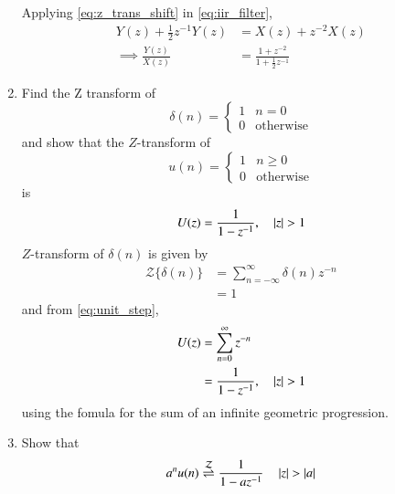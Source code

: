 \documentclass[journal,12pt,twocolumn]{IEEEtran}
\renewcommand\thesection{\arabic{section}}
\begin{document}
\begin{enumerate}[label=\thesection.\arabic*]

	
\solution  Applying \eqref{eq:z_trans_shift} in \eqref{eq:iir_filter},
\begin{align}
Y(z) + \frac{1}{2}z^{-1}Y(z) &= X(z)+z^{-2}X(z)
\\
\implies \frac{Y(z)}{X(z)} &= \frac{1 + z^{-2}}{1 + \frac{1}{2}z^{-1}}
\label{eq:freq_resp}
\end{align}
\item Find the Z transform of 
\begin{equation}
\delta(n)
=
\begin{cases}
1 & n = 0
\\
0 & \text{otherwise}
\end{cases}
\end{equation}
and show that the $Z$-transform of
\begin{equation}
\label{eq:unit_step}
u(n)
=
\begin{cases}
1 & n \ge 0
\\
0 & \text{otherwise}
\end{cases}
\end{equation}
is
\begin{equation}
U(z) = \frac{1}{1-z^{-1}}, \quad \left\vert z\right\vert > 1
\end{equation}
\solution $Z$-transform of $\delta(n)$ is given by
\begin{align}
	\mathcal{Z}\{\delta(n)\}&=\sum _{n= -\infty}^{\infty}\delta(n)z^{-n}\\
	&=1
\end{align} 
and from \eqref{eq:unit_step},
\begin{align}
U(z) &= \sum _{n= 0}^{\infty}z^{-n}
\\
&=\frac{1}{1-z^{-1}}, \quad \left\vert z\right\vert > 1
\end{align}
using the fomula for the sum of an infinite geometric progression.
%
\item Show that 
\begin{equation}
\label{eq:anun}
a^nu(n) \overset{\mathcal{Z}}{ \rightleftharpoons} \frac{1}{1-az^{-1}} \quad \left\vert z\right\vert > \left\vert a\right\vert
\end{equation}


\end{enumerate}
\end{document}
